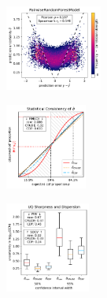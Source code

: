 \begin{figure}[H]
    \begin{subfigure}
    \centering
    \includegraphics[width=0.350\textwidth,valign=t]{uncertainty/figures/uq.pairwiserandomforestmodel-correlation.pdf}
    \end{subfigure}
    \begin{subfigure}
    \centering
    \includegraphics[width=0.295\textwidth,valign=t]{uncertainty/figures/uq.pairwiserandomforestmodel-consistency.pdf}
    \end{subfigure}
    \begin{subfigure}
    \centering
    \includegraphics[width=0.305\textwidth,valign=t]{uncertainty/figures/uq.pairwiserandomforestmodel-sharpness.pdf}
    \end{subfigure}


\end{figure}
